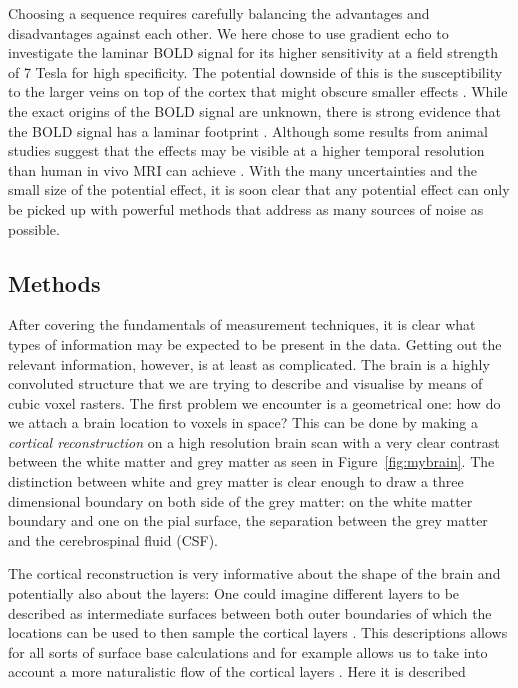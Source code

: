 Choosing a sequence requires carefully balancing the advantages and disadvantages against each other. We here chose to use gradient echo to investigate the laminar BOLD signal for its higher sensitivity at a field strength of 7 Tesla for high specificity. The potential downside of this is the susceptibility to the larger veins on top of the cortex that might obscure smaller effects \cite{Barth2007}. While the exact origins of the BOLD signal are unknown, there is strong evidence that the BOLD signal has a laminar footprint \cite{Logothetis2001}. Although some results from animal studies suggest that the effects may be visible at a higher temporal resolution than human in vivo MRI can achieve \cite{Yu2014,OHerron2016}. With the many uncertainties and the small size of the potential effect, it is soon clear that any potential effect can only be picked up with powerful methods that address as many sources of noise as possible. 

\subsection{Methods}
After covering the fundamentals of measurement techniques, it is clear what types of information may be expected to be present in the data. Getting out the relevant information, however, is at least as complicated. The brain is a highly convoluted structure that we are trying to describe and visualise by means of cubic voxel rasters. The first problem we encounter is a geometrical one: how do we attach a brain location to voxels in space? This can be done by making a \emph{cortical reconstruction} on a high resolution brain scan \cite{Dale1999,Bazin2012} with a very clear contrast between the white matter and grey matter as seen in Figure~\ref{fig:mybrain}. The distinction between white and grey matter is clear enough to draw a three dimensional boundary on both side of the grey matter: on the white matter boundary and one on the pial surface, the separation between the grey matter and the cerebrospinal fluid (CSF).


The cortical reconstruction is very informative about the shape of the brain and potentially also about the layers: One could imagine different layers to be described as intermediate surfaces between both outer boundaries of which the locations can be used to then sample the cortical layers \cite{Koopmans2011,Polimeni2010,DeMartino2013}.
This descriptions allows for all sorts of surface base calculations \cite{Fischl2000,Bazin2012} and for example allows us to take into account a more naturalistic flow of the cortical layers \cite{Bok1929,Waehnertr2014}. Here it is described 



